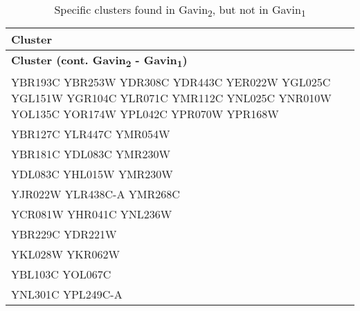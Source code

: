 \setlength{\extrarowheight}{2pt}
\renewcommand{\arraystretch}{1.2}
\begin{longtable}{| m{27em} |}
\caption{Specific clusters found in Gavin\textsubscript{2}, but not in Gavin\textsubscript{1}} \\
\hline
\textbf{Cluster} \\
\hline
\endfirsthead
\hline
\textbf{Cluster (cont. Gavin\textsubscript{2} - Gavin\textsubscript{1})} \\
\hline
\endhead
\hline
\endfoot
\hline
\endlastfoot
YBR193C YBR253W YDR308C YDR443C YER022W YGL025C YGL151W YGR104C YLR071C YMR112C YNL025C YNR010W YOL135C YOR174W YPL042C YPR070W YPR168W \\
\hline
YBR127C YLR447C YMR054W \\
\hline
YBR181C YDL083C YMR230W \\
\hline
YDL083C YHL015W YMR230W \\
\hline
YJR022W YLR438C-A YMR268C \\
\hline
YCR081W YHR041C YNL236W \\
\hline
YBR229C YDR221W \\
\hline
YKL028W YKR062W \\
\hline
YBL103C YOL067C \\
\hline
YNL301C YPL249C-A \\
\hline
\end{longtable}